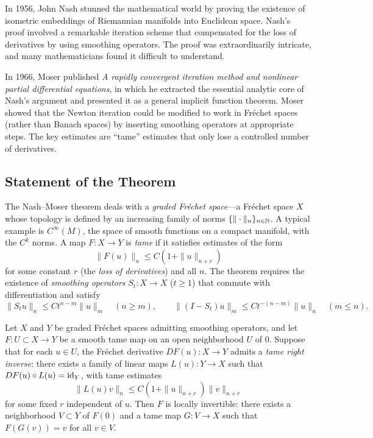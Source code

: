 In 1956, John Nash stunned the mathematical world by proving the existence of isometric embeddings of Riemannian manifolds into Euclidean space. Nash's proof involved a remarkable iteration scheme that compensated for the loss of derivatives by using smoothing operators. The proof was extraordinarily intricate, and many mathematicians found it difficult to understand.

In 1966, Moser published \textit{A rapidly convergent iteration method and nonlinear partial differential equations}, in which he extracted the essential analytic core of Nash's argument and presented it as a general implicit function theorem. Moser showed that the Newton iteration could be modified to work in Fr\'echet spaces (rather than Banach spaces) by inserting smoothing operators at appropriate steps. The key estimates are ``tame'' estimates that only lose a controlled number of derivatives.

\subsection{Statement of the Theorem}

The Nash--Moser theorem deals with a \textit{graded Fr\'echet space}---a Fr\'echet space $X$ whose topology is defined by an increasing family of norms $\{\|\cdot\|_n\}_{n \in \mathbb{N}}$. A typical example is $C^\infty(M)$, the space of smooth functions on a compact manifold, with the $C^k$ norms. A map $F: X \to Y$ is \textit{tame} if it satisfies estimates of the form
\[
\|F(u)\|_n \leq C(1 + \|u\|_{n+r})
\]
for some constant $r$ (the \textit{loss of derivatives}) and all $n$. The theorem requires the existence of \textit{smoothing operators} $S_t: X \to X$ ($t \geq 1$) that commute with differentiation and satisfy
\[
\|S_t u\|_n \leq C t^{n-m} \|u\|_m \quad (n \geq m), \qquad
\|(I - S_t)u\|_m \leq C t^{-(n-m)} \|u\|_n \quad (m \leq n).
\]

\begin{theorem}
Let $X$ and $Y$ be graded Fr\'echet spaces admitting smoothing operators, and let $F: U \subset X \to Y$ be a smooth tame map on an open neighborhood $U$ of $0$. Suppose that for each $u \in U$, the Fr\'echet derivative $DF(u): X \to Y$ admits a \textit{tame right inverse}: there exists a family of linear maps $L(u): Y \to X$ such that $DF(u) \circ L(u) = \operatorname{id}_Y$, with tame estimates
\[
\|L(u)v\|_n \leq C(1 + \|u\|_{n+r})\|v\|_{n+r}
\]
for some fixed $r$ independent of $u$. Then $F$ is locally invertible: there exists a neighborhood $V \subset Y$ of $F(0)$ and a tame map $G: V \to X$ such that $F(G(v)) = v$ for all $v \in V$.
\end{theorem}

